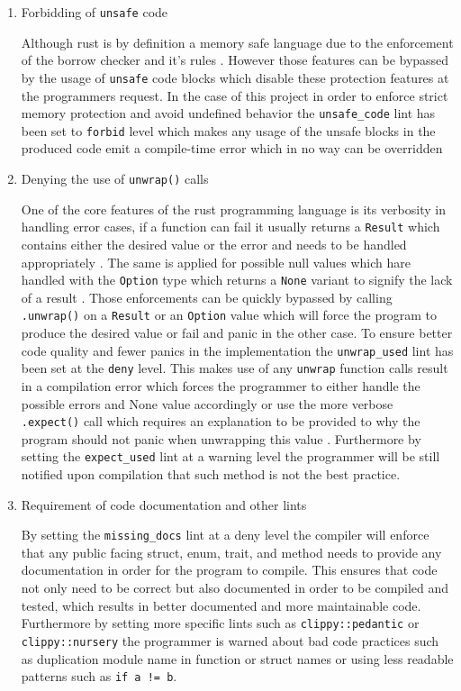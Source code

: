 \begin{enumerate}
    \item Forbidding of \verb|unsafe| code
    
    Although rust is by definition a memory safe language due to the enforcement of the borrow checker and it's rules \cite{TODO}. However those features can be bypassed by the usage of \verb|unsafe| code blocks which disable these protection features at the programmers request.
    In the case of this project in order to enforce strict memory protection and avoid undefined behavior the \verb|unsafe_code| lint has been set to \verb|forbid| level which makes any usage of the unsafe blocks in the produced code emit a compile-time error which in no way can be overridden \cite{TODO - rust book}

    \item  Denying the use of \verb|unwrap()| calls

    One of the core features of the rust programming language is its verbosity in handling error cases, if a function can fail it usually returns a \verb|Result| which contains either the desired value or the error and needs to be handled appropriately \cite{TODO}. The same is applied for possible null values which hare handled with the \verb|Option| type which returns a \verb|None| variant to signify the lack of a result \cite{TODO}. 
    Those enforcements can be quickly bypassed by calling \verb|.unwrap()| on a \verb|Result| or an \verb|Option| value which will force the program to produce the desired value or fail and panic in the other case.
    To ensure better code quality and fewer panics in the implementation the \verb|unwrap_used| lint has been set at the \verb|deny| level. 
    This makes use of any \verb|unwrap| function calls result in a compilation error which forces the programmer to either handle the possible errors and None value accordingly or use the more verbose \verb|.expect()| call which requires an explanation to be provided to why the program should not panic when unwrapping this value \cite{TODO rust book}. 
    Furthermore by setting the \verb|expect_used| lint at a warning level the programmer will be still notified upon compilation that such method is not the best practice.

    \item Requirement of code documentation and other lints

    By setting the \verb|missing_docs| lint at a deny level the compiler will enforce that any public facing struct, enum, trait, and method needs to provide any documentation in order for the program to compile. This ensures that code not only need to be correct but also documented in order to be compiled and tested, which results in better documented and more maintainable code. 
    Furthermore by setting more specific lints such as \verb|clippy::pedantic| or \verb|clippy::nursery| the programmer is warned about bad code practices such as duplication module name in function or struct names or using less readable patterns such as \verb|if a != b|.
\end{enumerate}

